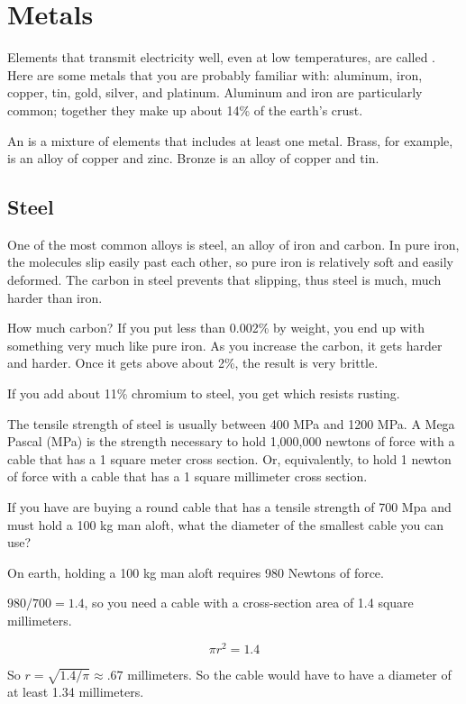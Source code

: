 \chapter{Metals}

Elements that transmit electricity well, even at low temperatures, are
called . Here are some metals that you are probably familiar
with: aluminum, iron, copper, tin, gold, silver, and platinum. Aluminum and
iron are particularly common; together they make up about 14\% of the
earth's crust.

An  is a mixture of elements that includes at least one
metal. Brass, for example, is an alloy of copper and zinc.  Bronze is
an alloy of copper and tin.



\section{Steel}

One of the most common alloys is steel, an alloy of iron and carbon.
In pure iron, the molecules slip easily past each other, so pure iron
is relatively soft and easily deformed. The carbon in steel prevents
that slipping, thus steel is much, much harder than iron.

How much carbon? If you put less than 0.002\% by weight, you end up
with something very much like pure iron.  As you increase the carbon,
it gets harder and harder.  Once it gets above about 2\%, the result
is very brittle.

If you add about 11\% chromium to steel, you get  which resists rusting.

\begin{Exercise}[title={Tensile Strength}, label=tensile-mpa]

The tensile strength of steel is usually between 400 MPa and 1200
MPa. A Mega Pascal (MPa) is the strength necessary to hold 1,000,000 newtons of
force with a cable that has a 1 square meter cross section. Or,
equivalently, to hold 1 newton of force with a cable that has a 1
square millimeter cross section. 

If you have are buying a round cable that has a tensile strength of
700 Mpa and must hold a 100 kg man aloft, what the diameter of the
smallest cable you can use?
  
\end{Exercise}
\begin{Answer}[ref=tensile-mpa]
On earth, holding a 100 kg man aloft requires 980 Newtons of force.

$980/700 = 1.4$, so you need a cable with a cross-section area of 1.4
square millimeters.

$$\pi r^2 = 1.4$$

So $r = \sqrt{1.4/\pi} \approx .67$ millimeters.  So the cable would
have to have a diameter of at least 1.34 millimeters.

\end{Answer}

